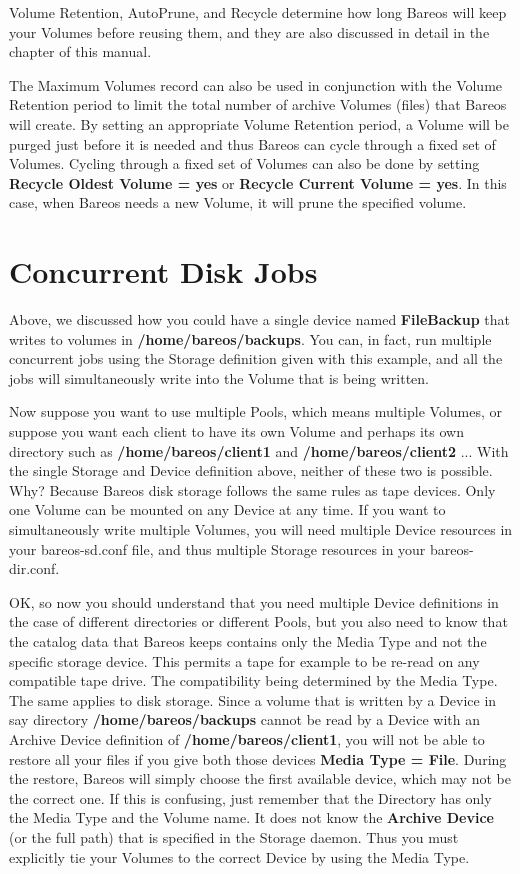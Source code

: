 Volume Retention, AutoPrune, and Recycle determine how long Bareos will keep
your Volumes before reusing them, and they are also discussed in detail in the
 chapter of
this manual.

The Maximum Volumes record can also be used in conjunction with the Volume
Retention period to limit the total number of archive Volumes (files) that
Bareos will create. By setting an appropriate Volume Retention period, a
Volume will be purged just before it is needed and thus Bareos can cycle
through a fixed set of Volumes. Cycling through a fixed set of Volumes can
also be done by setting {\bf Recycle Oldest Volume = yes} or {\bf Recycle
Current Volume = yes}. In this case, when Bareos needs a new Volume, it will
prune the specified volume.

\label{ConcurrentDiskJobs}
\section{Concurrent Disk Jobs}
Above, we discussed how you could have a single device named {\bf
FileBackup} that writes to volumes in {\bf /home/bareos/backups}.
You can, in fact, run multiple concurrent jobs using the
Storage definition given with this example, and all the jobs will
simultaneously write into the Volume that is being written.

Now suppose you want to use multiple Pools, which means multiple
Volumes, or suppose you want each client to have its own Volume
and perhaps its own directory such as {\bf /home/bareos/client1}
and {\bf /home/bareos/client2} ... With the single Storage and Device
definition above, neither of these two is possible.  Why?  Because
Bareos disk storage follows the same rules as tape devices. Only
one Volume can be mounted on any Device at any time. If you want
to simultaneously write multiple Volumes, you will need multiple
Device resources in your bareos-sd.conf file, and thus multiple
Storage resources in your bareos-dir.conf.

OK, so now you should understand that you need multiple Device definitions
in the case of different directories or different Pools, but you also
need to know that the catalog data that Bareos keeps contains only
the Media Type and not the specific storage device.  This permits a tape
for example to be re-read on any compatible tape drive.  The compatibility
being determined by the Media Type.  The same applies to disk storage.
Since a volume that is written by a Device in say directory {\bf
/home/bareos/backups}  cannot be read by a Device with an Archive Device
definition of {\bf /home/bareos/client1}, you will not be able to
restore all your files if you give both those devices
{\bf Media Type = File}. During the restore, Bareos will simply choose
the first available device, which may not be the correct one.  If this
is confusing, just remember that the Directory has only the Media Type
and the Volume name.  It does not know the {\bf Archive Device} (or the
full path) that is specified in the Storage daemon.  Thus you must
explicitly tie your Volumes to the correct Device by using the Media Type.

